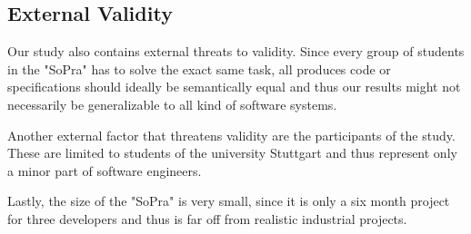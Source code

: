 \subsection{External Validity}

Our study also contains external threats to validity. Since every group of students in the "SoPra"
has to solve the exact same task, all produces code or specifications should ideally be semantically
equal and thus our results might not necessarily be generalizable to all kind of software systems.

Another external factor that threatens validity are the participants of the study. These are limited
to students of the university Stuttgart and thus represent only a minor part of software engineers.

Lastly, the size of the "SoPra" is very small, since it is only a six month project for three developers and thus is far off from realistic industrial projects.

